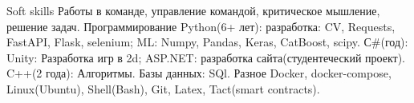 

\begin{cvskills}
  \cvskill
    {Soft skills}
    {Работы в команде, управление командой, критическое мышление, решение задач.}
    {}
  \cvskill
    {Программирование}
    {Python(6+ лет): разработка: CV, Requests, FastAPI, Flask, selenium; ML: Numpy, Pandas, Keras, CatBoost, scipy.
    \newline
    С\#(год): Unity: Разработка игр в 2d; ASP.NET: разработка сайта(студентеческий проект).
    \newline
    C++(2 года): Алгоритмы.
    \newline
    Базы данных: SQl.}
  \cvskill
    {Разное}
    {Docker, docker-compose, Linux(Ubuntu), Shell(Bash), Git, Latex, Tact(smart contracts).}
    {}

\end{cvskills}
